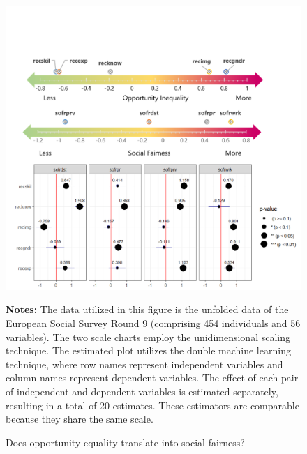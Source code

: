 \begin{figure}[h!]
	\centering
	\includegraphics[width=1\textwidth]{figs/fig5.png}
	\caption{Does opportunity equality translate into social fairness?}
	\label{fig:fig5}
		\begin{minipage}{1\linewidth}
		\vspace{0.2cm}
		\footnotesize
		\textbf{Notes:}	The data utilized in this figure is the unfolded data of the European Social Survey Round 9 (comprising 454 individuals and 56 variables). The two scale charts employ the unidimensional scaling technique. The estimated plot utilizes the double machine learning technique, where row names represent independent variables and column names represent dependent variables. The effect of each pair of independent and dependent variables is estimated separately, resulting in a total of 20 estimates. These estimators are comparable because they share the same scale.
	\end{minipage}
	
\end{figure}

